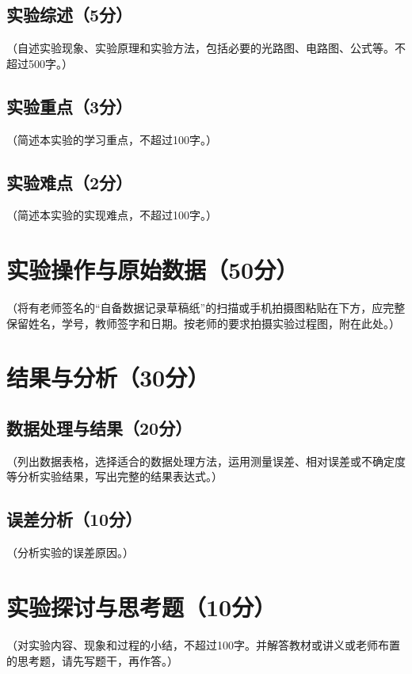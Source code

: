 \documentclass[10pt,a4paper]{ctexart} %
\begin{document}
  \subsection{实验综述（5分）}
  （自述实验现象、实验原理和实验方法，包括必要的光路图、电路图、公式等。不超过500字。）

  \subsection{实验重点（3分）}
  （简述本实验的学习重点，不超过100字。）

  \subsection{实验难点（2分）}
  （简述本实验的实现难点，不超过100字。）

\section{实验操作与原始数据（50分）}
（将有老师签名的“自备数据记录草稿纸”的扫描或手机拍摄图粘贴在下方，应完整保留姓名，学号，教师签字和日期。按老师的要求拍摄实验过程图，附在此处。）

\section{结果与分析（30分）}

  \subsection{数据处理与结果（20分）}  
  （列出数据表格，选择适合的数据处理方法，运用测量误差、相对误差或不确定度等分析实验结果，写出完整的结果表达式。）

  \subsection{误差分析（10分）}
  （分析实验的误差原因。）

\section{实验探讨与思考题（10分）}
（对实验内容、现象和过程的小结，不超过100字。并解答教材或讲义或老师布置的思考题，请先写题干，再作答。）
\end{document}
